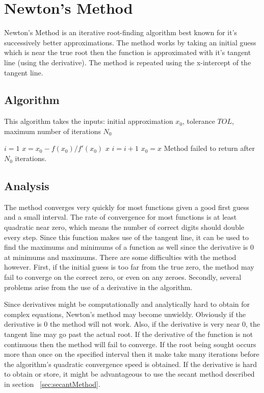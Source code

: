 \documentclass[12pt,oneside]{amsart}
\begin{document}
\section{Newton's Method}\label{sec:newtonsMethod}

Newton's Method is an iterative root-finding algorithm best known for it's successively better approximations. The method works by taking an initial guess which is near the true root then the function is approximated with it's tangent line (using the derivative). The method is repeated using the x-intercept of the tangent line.

\subsection{Algorithm}
This algorithm takes the inputs: initial approximation $x_0$, tolerance $TOL$, maximum number of iterations $N_0$
\begin{algorithmic}
   \STATE $i=1$
      \STATE $x=x_0 - f(x_0)/f'(x_0)$
      \RETURN $x$
      \ENDIF
      \STATE $i = i + 1$
      \STATE $x_0 = x$
   \ENDWHILE
   \PRINT Method failed to return after $N_0$ iterations.
\end{algorithmic}

\subsection{Analysis}\label{subsec:newtonAnalysis}

The method converges very quickly for most functions given a good first guess and a small interval. The rate of convergence for most functions is at least quadratic near zero, which means the number of correct digits should double every step. Since this function makes use of the tangent line, it can be used to find the maximums and minimums of a function as well since the derivative is 0 at minimums and maximums. There are some difficulties with the method however. First, if the initial guess is too far from the true zero, the method may fail to converge on the correct zero, or even on any zeroes. Secondly, several problems arise from the use of a derivative in the algorithm.

Since derivatives might be computationally and analytically hard to obtain for complex equations, Newton's method may become unwieldy. Obviously if the derivative is 0 the method will not work. Also, if the derivative is very near 0, the tangent line may go past the actual root. If the derivative of the function is not continuous then the method will fail to converge. If the root being sought occurs more than once on the specified interval then it make take many iterations before the algorithm's quadratic convergence speed is obtained. If the derivative is hard to obtain or store, it might be advantageous to use the secant method described in section ~\ref{sec:secantMethod}.
\end{document}
